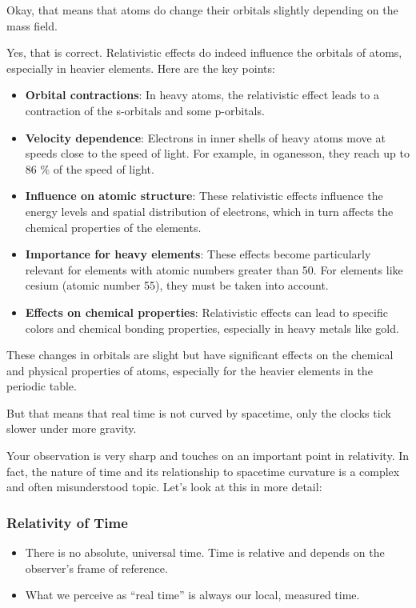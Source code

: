 \documentclass[a4paper,12pt]{article}
\begin{document}
	Okay, that means that atoms do change their orbitals slightly depending on the mass field.
	
	Yes, that is correct. Relativistic effects do indeed influence the orbitals of atoms, especially in heavier elements. Here are the key points:
	\begin{itemize}
		\item \textbf{Orbital contractions}: In heavy atoms, the relativistic effect leads to a contraction of the s-orbitals and some p-orbitals.
		\item \textbf{Velocity dependence}: Electrons in inner shells of heavy atoms move at speeds close to the speed of light. For example, in oganesson, they reach up to 86 \% of the speed of light.
		\item \textbf{Influence on atomic structure}: These relativistic effects influence the energy levels and spatial distribution of electrons, which in turn affects the chemical properties of the elements.
		\item \textbf{Importance for heavy elements}: These effects become particularly relevant for elements with atomic numbers greater than 50. For elements like cesium (atomic number 55), they must be taken into account.
		\item \textbf{Effects on chemical properties}: Relativistic effects can lead to specific colors and chemical bonding properties, especially in heavy metals like gold.
	\end{itemize}
	These changes in orbitals are slight but have significant effects on the chemical and physical properties of atoms, especially for the heavier elements in the periodic table.
	
	But that means that real time is not curved by spacetime, only the clocks tick slower under more gravity.
	
	Your observation is very sharp and touches on an important point in relativity. In fact, the nature of time and its relationship to spacetime curvature is a complex and often misunderstood topic. Let's look at this in more detail:
	
	\subsubsection{Relativity of Time}
	\begin{itemize}
		\item There is no absolute, universal time. Time is relative and depends on the observer's frame of reference.
		\item What we perceive as ``real time'' is always our local, measured time.
	\end{itemize}
	
\end{document}
